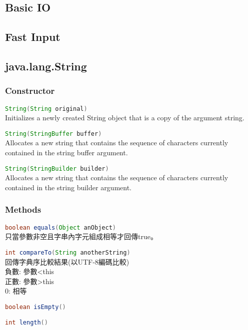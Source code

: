 \subsection{Basic IO}
    
\subsection{Fast Input}
    
\subsection{java.lang.String}
    \subsubsection{Constructor}
        \lstinline[language=Java]{String(String original)}\\
        Initializes a newly created String object that is a copy of the argument string.

        \noindent
        \lstinline[language=Java]{String(StringBuffer buffer)}\\
        Allocates a new string that contains the sequence of characters currently contained in the string buffer argument.

        \noindent
        \lstinline[language=Java]{String(StringBuilder builder)}\\
        Allocates a new string that contains the sequence of characters currently contained in the string builder argument.
    \subsubsection{Methods}
        \lstinline[language=Java]{boolean equals(Object anObject)}\\
        只當參數非空且字串內字元組成相等才回傳true。

        \noindent
        \lstinline[language=Java]{int compareTo(String anotherString)}\\
        回傳字典序比較結果(以UTF-8編碼比較)\\
        負數: 參數<this\\
        正數: 參數>this\\
        0: 相等

        \noindent
        \lstinline[language=Java]{boolean isEmpty()}
        
        \noindent
        \lstinline[language=Java]{int length()}

